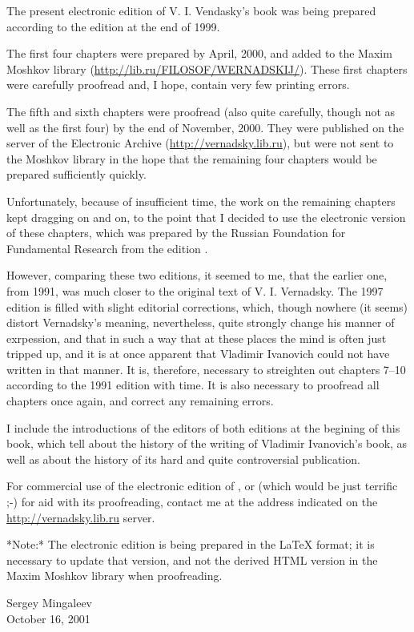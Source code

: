 
The present electronic edition of V. I. Vendasky's book  was being prepared according to the
edition at the end of 1999.

The first four chapters were prepared by April, 2000, and added to the Maxim
Moshkov library (\url{http://lib.ru/FILOSOF/WERNADSKIJ/}).  These first
chapters were carefully proofread and, I hope, contain very few printing
errors.

The fifth and sixth chapters were proofread (also quite carefully, though not
as well as the first four) by the end of November, 2000.  They were published
on the server of the Electronic Archive (\url{http://vernadsky.lib.ru}), but
were not sent to the Moshkov library in the hope that the remaining four
chapters would be prepared sufficiently quickly.

Unfortunately, because of insufficient time, the work on the remaining chapters
kept dragging on and on, to the point that I decided to use the electronic
version of these chapters, which was prepared by the Russian Foundation for
Fundamental Research
from the edition .

However, comparing these two editions, it seemed to me, that the earlier one,
from 1991, was much closer to the original text of V. I. Vernadsky.  The 1997
edition is filled with slight editorial corrections, which, though nowhere (it
seems) distort Vernadsky's meaning, nevertheless, quite strongly change his
manner of exrpession, and that in such a way that at these places the mind is
often just tripped up, and it is at once apparent that Vladimir Ivanovich could
not have written in that manner.  It is, therefore, necessary to streighten out
chapters 7--10 according to the 1991 edition with time.  It is also necessary
to proofread all chapters once again, and correct any remaining errors.

I include the introductions of the editors of both editions at the begining of
this book, which tell about the history of the writing of Vladimir Ivanovich's
book, as well as about the history of its hard and quite controversial
publication.

For commercial use of the electronic edition of , or (which would be just terrific ;-) for aid with its
proofreading, contact me at the address indicated on the
\url{http://vernadsky.lib.ru} server.

*Note:* The electronic edition is being prepared in the LaTeX format; it is
necessary to update that version, and not the derived HTML version in the Maxim
Moshkov library when proofreading.

\begin{flushright}
Sergey Mingaleev\\
October 16, 2001
\end{flushright}
